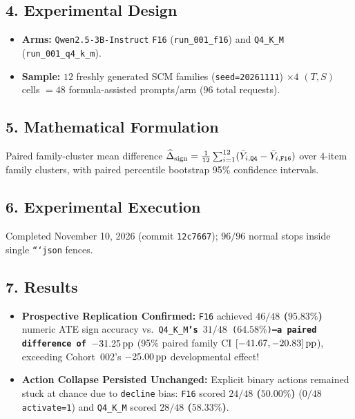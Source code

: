\subsection*{4. Experimental Design}
\begin{itemize}
  \item \textbf{Arms:} \texttt{Qwen2.5-3B-Instruct} \texttt{F16} (\texttt{run\_001\_f16}) and \texttt{Q4\_K\_M} (\texttt{run\_001\_q4\_k\_m}).
  \item \textbf{Sample:} $12$ freshly generated SCM families (\texttt{seed=20261111}) $\times 4$ $(T,S)$ cells $= 48$ formula-assisted prompts/arm ($96$ total requests).
\end{itemize}

\subsection*{5. Mathematical Formulation}
Paired family-cluster mean difference $\widehat{\Delta}_{\mathrm{sign}} = \frac{1}{12}\sum_{i=1}^{12} (\bar{Y}_{i,\text{\texttt{Q4}}} - \bar{Y}_{i,\text{\texttt{F16}}})$ over $4$-item family clusters, with paired percentile bootstrap 95\% confidence intervals.

\subsection*{6. Experimental Execution}
Completed November 10, 2026 (commit \texttt{12c7667}); $96/96$ normal stops inside single \texttt{```json} fences.

\subsection*{7. Results}
\begin{itemize}
  \item \textbf{Prospective Replication Confirmed:} \texttt{F16} achieved \textbf{$46/48$ ($95.83\%$)} numeric ATE sign accuracy vs.\ \texttt{Q4\_K\_M\textbf{'s }$31/48$ ($64.58\%$)\textbf{---a paired difference of }$-31.25\,\mathrm{pp}$} (95\% paired family CI $[-41.67, -20.83]\,\mathrm{pp}$), exceeding Cohort~002's $-25.00\,\mathrm{pp}$ developmental effect!
  \item \textbf{Action Collapse Persisted Unchanged:} Explicit binary actions remained stuck at chance due to \texttt{decline} bias: \texttt{F16} scored \textbf{$24/48$ ($50.00\%$)} ($0/48$ \texttt{activate=1}) and \texttt{Q4\_K\_M} scored \textbf{$28/48$ ($58.33\%$)}.
\end{itemize}

